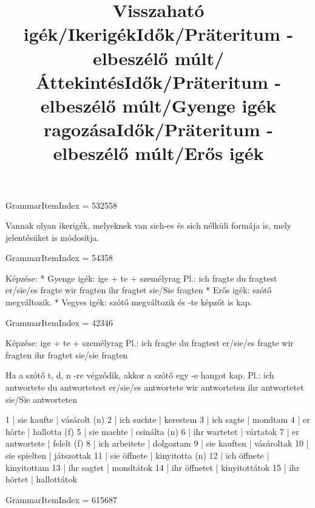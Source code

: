 \title{Visszaható igék/Ikerigék}

GrammarItemIndex = 532558

\begin{desc}
Vannak olyan ikerigék, melyeknek van sich-es és sich nélküli formája is, mely jelentésüket is módosítja.
\end{desc}

\begin{exmp}
\end{exmp}

\title{Idők/Präteritum - elbeszélő múlt/Áttekintés}

GrammarItemIndex = 54358

\begin{desc}
Képzése:
* Gyenge igék: ige + te + személyrag
  Pl.: ich fragte 
       du fragtest 
       er/sie/es fragte 
       wir fragten 
       ihr fragtet 
       sie/Sie fragten
* Erős igék: szótő megváltozik.
* Vegyes igék: szótő megváltozik és -te képzőt is kap.
\end{desc}

\begin{exmp}
\end{exmp}

\title{Idők/Präteritum - elbeszélő múlt/Gyenge igék ragozása}

GrammarItemIndex = 42346

\begin{desc}
Képzése: ige + te + személyrag
Pl.:
ich fragte
du fragtest
er/sie/es fragte
wir fragten
ihr fragtet
sie/sie fragten

Ha a szótő t, d, n -re végződik, akkor a szótő egy -e hangot kap.
Pl.:
ich antwortete
du antwortetest
er/sie/es antwortete
wir antworteten
ihr antwortetet
sie/Sie antworteten
\end{desc}

\begin{exmp}
1 | sie kaufte | vásárolt (n)
2 | ich suchte | kerestem
3 | ich sagte | mondtam
4 | er hörte | hallotta (f)
5 | sie machte | csinálta (n)
6 | ihr wartetet | vártatok
7 | er antwortete | felelt (f)
8 | ich arbeitete | dolgoztam
9 | sie kauften | vásároltak
10 | sie spielten | játszottak
11 | sie öffnete | kinyitotta (n)
12 | ich öffnete | kinyitottam
13 | ihr sagtet | mondtátok
14 | ihr öffnetet | kinyitottátok
15 | ihr hörtet | hallottátok
\end{exmp}

\title{Idők/Präteritum - elbeszélő múlt/Erős igék}

GrammarItemIndex = 615687

